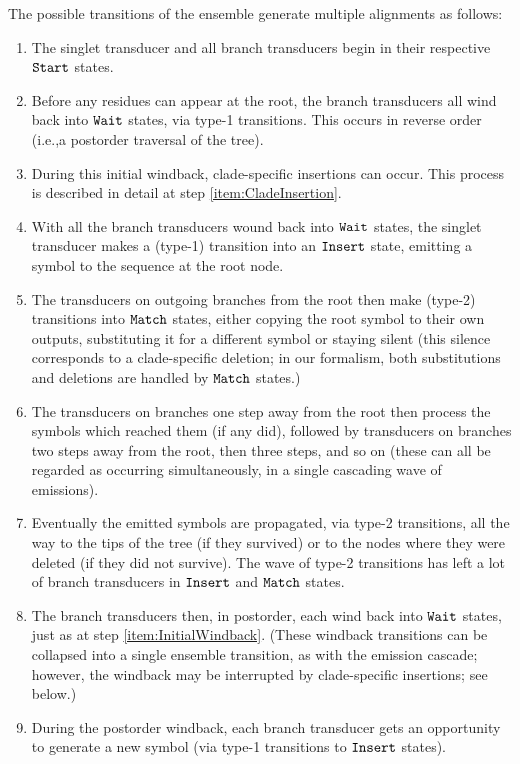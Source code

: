 \documentclass[10pt]{article}
\begin{document}
The possible transitions of the ensemble generate multiple alignments as follows:
\begin{enumerate}
\item
  The singlet transducer and all branch transducers begin in their respective $\mathtt{Start}$ states.
\item \label{item:InitialWindback}
  Before any residues can appear at the root, the branch transducers all wind back into $\mathtt{Wait}$ states,
  via type-1 transitions. This occurs in reverse order (i.e.,a postorder traversal of the tree).
\item During this initial windback, clade-specific insertions can occur.
  This process is described in detail at step \ref{item:CladeInsertion}.
\item \label{item:SingletStart}
  With all the branch transducers wound back into $\mathtt{Wait}$ states,
  the singlet transducer makes a (type-1) transition into an $\mathtt{Insert}$ state, emitting a symbol to the sequence at the root node.
\item The transducers on outgoing branches from the root then make (type-2) transitions into $\mathtt{Match}$ states,
  either copying the root symbol to their own outputs,
  substituting it for a different symbol or staying silent (this silence corresponds to a clade-specific deletion;
  in our formalism, both substitutions and deletions are handled by $\mathtt{Match}$ states.)
\item The transducers on branches one step away from the root then process the symbols which reached them
  (if any did), followed by transducers on branches two steps away from the root, then three steps, and so on
  (these can all be regarded as occurring simultaneously, in a single cascading wave of emissions).
\item \label{item:Windback}
  Eventually the emitted symbols are propagated, via type-2 transitions,
  all the way to the tips of the tree (if they survived)
  or to the nodes where they were deleted (if they did not survive).
  The wave of type-2 transitions has left a lot of branch transducers in $\mathtt{Insert}$ and $\mathtt{Match}$ states.
\item The branch transducers then, in postorder, each wind back into $\mathtt{Wait}$ states, just as at step \ref{item:InitialWindback}.
  (These windback transitions can be collapsed into a single ensemble transition, as with the emission cascade;
  however, the windback may be interrupted by clade-specific insertions; see below.)
\item \label{item:CladeInsertion}
  During the postorder windback, each branch transducer gets an opportunity to generate a new symbol (via type-1 transitions to $\mathtt{Insert}$ states).

\end{enumerate}
\end{document}
